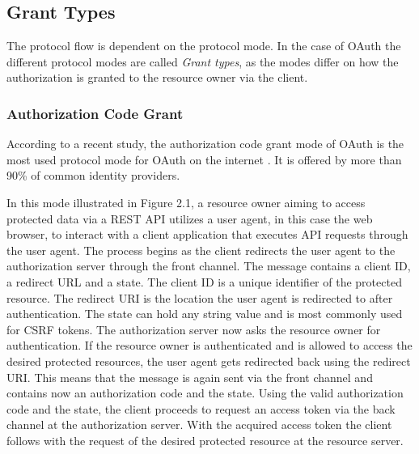\documentclass[
    fontsize=12pt,
    headings=small,
    parskip=half,           %
    bibliography=totoc,
    numbers=noenddot,       %
    open=any,               %
    ]{scrreprt}
\begin{document}
\subsection{Grant Types}
The protocol flow is dependent on the protocol mode. In the case of OAuth the
different protocol modes are called \emph{Grant types}, as the modes differ on
how the authorization is granted to the resource owner via the client.

\subsubsection{Authorization Code Grant}
According to a recent study, the authorization code grant mode of OAuth is the
most used protocol mode for OAuth on the internet
\cite[Table1]{philippaerts2022oauch}. It is offered by more than 90\% of common 
identity providers.

In this mode illustrated in Figure 2.1, a resource owner aiming to access
protected data via a REST API utilizes a user agent, in this case the web
browser, to interact with a client application that executes API requests
through the user agent. The process begins as the client redirects the user
agent to the authorization server through the front channel. The message
contains a client ID, a redirect URL and a state. The client ID is a unique
identifier of the protected resource. The redirect URI is the location the user
agent is redirected to after authentication. The state can hold any string
value and is most commonly used for CSRF tokens. The authorization server now
asks the resource owner for authentication. If the resource owner is
authenticated and is allowed to access the desired protected resources, the
user agent gets redirected back using the redirect URI. This means that the
message is again sent via the front channel and contains now an authorization
code and the state. Using the valid authorization code and the state, the
client proceeds to request an access token via the back channel at the
authorization server. With the acquired access token the client follows with
the request of the desired protected resource at the resource server.
\end{document}

